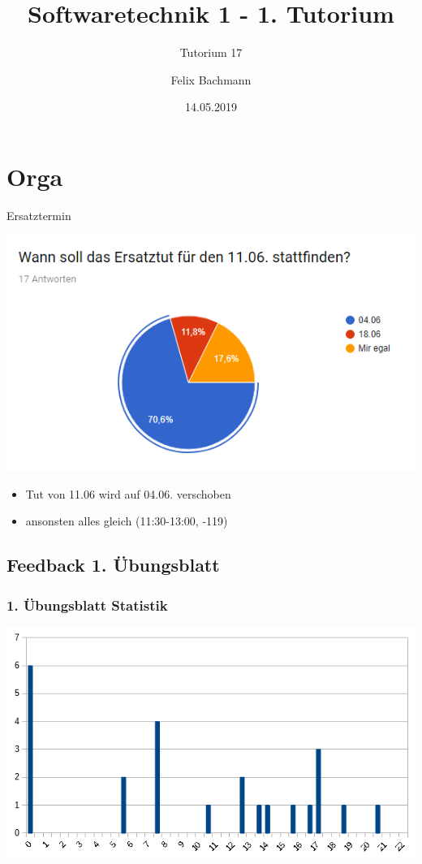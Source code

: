 \documentclass[18pt]{beamer}
\title[SWT1]{Softwaretechnik 1 - 1. Tutorium}
\subtitle{Tutorium 17}
\author{Felix Bachmann}
\date{14.05.2019}
\institute{KIT - Institut für Programmstrukturen und Datenorganisation (IPD)}
\begin{document}

\begin{frame}
\titlepage
\end{frame}

\section{Orga}

	\begin{frame}{Ersatztermin}

	\centering
	\includegraphics[scale=0.7]{pics/tut1/poll.png}
		\begin{itemize}
		\item Tut von 11.06 wird auf 04.06. verschoben
		\item ansonsten alles gleich (11:30-13:00, -119) 
	\end{itemize}
\end{frame}


	\subsection{Feedback 1. Übungsblatt}
	\begin{frame}
		\frametitle{1. Übungsblatt Statistik}
		\includegraphics[scale=0.7]{./pics/tut1/statistics_ub1.png}
	\end{frame}
	
\end{document}
